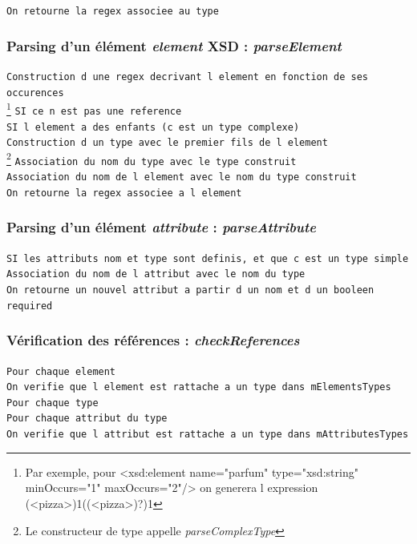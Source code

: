 		\lstinline$On retourne la regex associee au type$\\


	\subsubsection{Parsing d'un élément \textit{element} XSD : \textit{parseElement}}
		\lstinline$Construction d une regex decrivant l element en fonction de ses occurences$\\ \footnote{Par exemple, pour <xsd:element name="parfum" type="xsd:string" minOccurs="1" maxOccurs="2"/> on generera l expression (<pizza>){1}((<pizza>)?){1}}
		\lstinline$SI ce n est pas une reference$\\
		\indent \lstinline$SI l element a des enfants (c est un type complexe)$\\
		\indent \indent \lstinline$Construction d un type avec le premier fils de l element$\\ \footnote{Le constructeur de type appelle \textit{parseComplexType}}
		\indent \indent \lstinline$Association du nom du type avec le type construit$\\
		\indent \lstinline$Association du nom de l element avec le nom du type construit$\\
		\lstinline$On retourne la regex associee a l element$\\


	\subsubsection{Parsing d'un élément \textit{attribute} : \textit{parseAttribute}}
		\lstinline$SI les attributs nom et type sont definis, et que c est un type simple$\\
		\indent \lstinline$Association du nom de l attribut avec le nom du type$\\
		\lstinline$On retourne un nouvel attribut a partir d un nom et d un booleen required$\\


	\subsubsection{Vérification des références : \textit{checkReferences}}
		\lstinline$Pour chaque element$\\
		\indent \lstinline$On verifie que l element est rattache a un type dans mElementsTypes$\\
		\lstinline$Pour chaque type$\\
		\indent \lstinline$Pour chaque attribut du type$\\
		\indent \indent \lstinline$On verifie que l attribut est rattache a un type dans mAttributesTypes$\\


